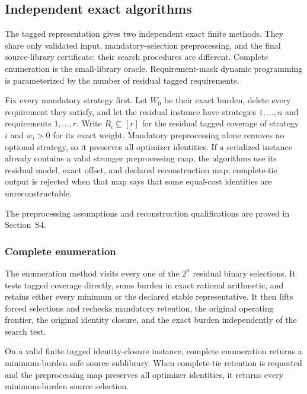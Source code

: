\subsection{Independent exact algorithms}
\label{subsec:aor-exact-algorithms}

The tagged representation gives two independent exact finite methods.  They
share only validated input, mandatory-selection preprocessing, and the final
source-library certificate; their search procedures are different.  Complete
enumeration is the small-library oracle.  Requirement-mask dynamic programming
is parameterized by the number of residual tagged requirements.

Fix every mandatory strategy first.  Let $W_0$ be their exact burden, delete
every requirement they satisfy, and let the residual instance have strategies
$1,\ldots,n$ and requirements $1,\ldots,r$.  Write $R_i\subseteq[r]$ for
the residual tagged coverage of strategy $i$ and $w_i>0$ for its exact weight.
Mandatory preprocessing alone removes no optional strategy, so it preserves
all optimizer identities.  If a serialized instance already contains a valid
stronger preprocessing map, the algorithms use its residual model, exact
offset, and declared reconstruction map; complete-tie output is rejected when
that map says that some equal-cost identities are unreconstructable.

The preprocessing assumptions and reconstruction qualifications are proved in Section~S4.

\subsubsection{Complete enumeration}
The enumeration method visits every one of the $2^n$ residual binary
selections.  It tests tagged coverage directly, sums burden in exact rational
arithmetic, and retains either every minimum or the declared stable
representative.  It then lifts forced selections and rechecks mandatory
retention, the original operating frontier, the original identity closure, and
the exact burden independently of the search test.

\begin{proposition}
\label{prop:aor-complete-enumeration}
On a valid finite tagged identity-closure instance, complete enumeration
returns a minimum-burden safe source sublibrary.  When complete-tie retention
is requested and the preprocessing map preserves all optimizer identities, it
returns every minimum-burden source selection.
\end{proposition}

